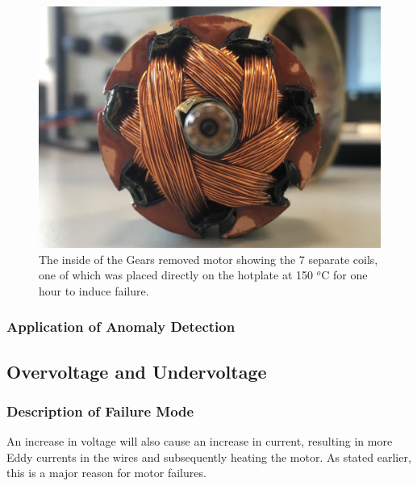 \begin{figure}[t]
    \includegraphics[width=1.0\textwidth]{fig/Gears_Removed_Inside.JPG}
    \caption[Motor Placed on Hotplate]{The inside of the Gears removed motor showing the 7 separate coils, one of which was placed directly on the hotplate at 150 $^o$C for one hour to induce failure.}
    \label{fig:hotplate_motor}
\end{figure}


\subsubsection{Application of Anomaly Detection}






\subsection{Overvoltage and Undervoltage}

\subsubsection{Description of Failure Mode}
An increase in voltage will also cause an increase in current, resulting in more Eddy currents in the wires and subsequently heating the motor. As stated earlier, this is a major reason for motor failures. 

